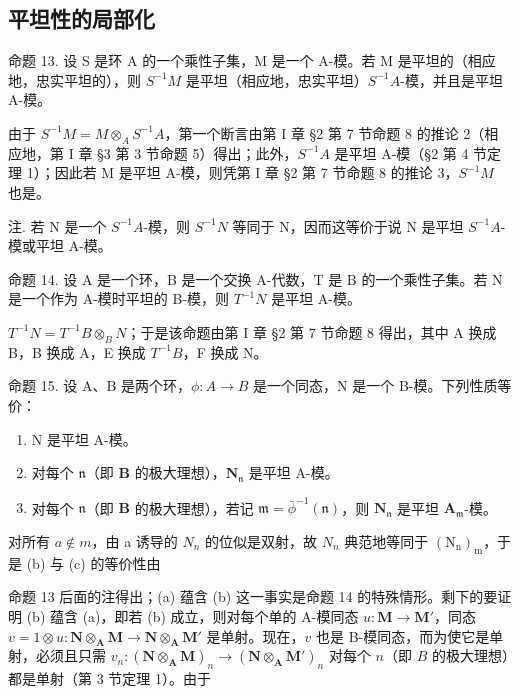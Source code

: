 \subsection{平坦性的局部化}

命题 13. 设 S 是环 A 的一个乘性子集，M 是一个 A-模。若 M 是平坦的（相应地，忠实平坦的），则 \(S^{-1}M\) 是平坦（相应地，忠实平坦）\(S^{-1}A\)-模，并且是平坦 A-模。

由于 \(S^{-1}M = M \otimes_{A} S^{-1}A\)，第一个断言由第 I 章 §2 第 7 节命题 8 的推论 2（相应地，第 I 章 §3 第 3 节命题 5）得出；此外，\(S^{-1}A\) 是平坦 A-模（§2 第 4 节定理 1）；因此若 M 是平坦 A-模，则凭第 I 章 §2 第 7 节命题 8 的推论 3，\(S^{-1}M\) 也是。

注. 若 N 是一个 \(S^{-1}A\)-模，则 \(S^{-1}N\) 等同于 N，因而这等价于说 N 是平坦 \(S^{-1}A\)-模或平坦 A-模。

命题 14. 设 A 是一个环，B 是一个交换 A-代数，T 是 B 的一个乘性子集。若 N 是一个作为 A-模时平坦的 B-模，则 \(T^{-1}N\) 是平坦 A-模。

\(T^{-1}N = T^{-1}B \otimes_{B} N\)；于是该命题由第 I 章 §2 第 7 节命题 8 得出，其中 A 换成 B，B 换成 A，E 换成 \(T^{-1}B\)，F 换成 N。

命题 15. 设 A、B 是两个环，\(\phi: A \to B\) 是一个同态，N 是一个 B-模。下列性质等价：

\begin{enumerate}
\def\labelenumi{(\alph{enumi})}
\item
  N 是平坦 A-模。
\item
  对每个 \(\mathfrak{n}\)（即 \(\mathbf{B}\) 的极大理想），\(\mathbf{N}_{\mathfrak{n}}\) 是平坦 A-模。
\item
  对每个 \(\mathfrak{n}\)（即 \(\mathbf{B}\) 的极大理想），若记 \(\mathfrak{m} = \bar{\phi}^{-1}(\mathfrak{n})\)，则 \(\mathbf{N}_{\mathfrak{n}}\) 是平坦 \(\mathbf{A}_{\mathfrak{m}}\)-模。
\end{enumerate}

对所有 \(a \notin m\)，由 a 诱导的 \(N_{n}\) 的位似是双射，故 \(N_{n}\) 典范地等同于 \((\mathrm{N}_{\mathrm{n}})_{\mathrm{m}}\)，于是 (b) 与 (c) 的等价性由

命题 13 后面的注得出；(a) 蕴含 (b) 这一事实是命题 14 的特殊情形。剩下的要证明 (b) 蕴含 (a)，即若 (b) 成立，则对每个单的 A-模同态 \(u: \mathbf{M} \to \mathbf{M}'\)，同态 \(v = 1 \otimes u: \mathbf{N} \otimes_{\mathbf{A}} \mathbf{M} \to \mathbf{N} \otimes_{\mathbf{A}} \mathbf{M}'\) 是单射。现在，\(v\) 也是 B-模同态，而为使它是单射，必须且只需 \(v_n: (\mathbf{N} \otimes_{\mathbf{A}} \mathbf{M})_n \to (\mathbf{N} \otimes_{\mathbf{A}} \mathbf{M}')_n\) 对每个 \(n\)（即 \(B\) 的极大理想）都是单射（第 3 节定理 1）。由于


